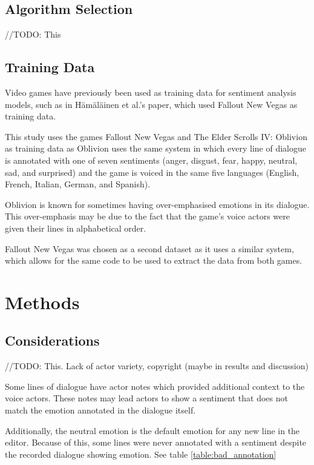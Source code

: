 \documentclass[journal]{IEEEtran}
\begin{document}
\subsection{Algorithm Selection}
//TODO: This

\subsection{Training Data}
Video games have previously been used as training data for sentiment analysis models, such as in
Hämäläinen et al.'s paper, \cite{hamalainen_video_2022} which used Fallout New Vegas as training data.

This study uses the games Fallout New Vegas and The Elder Scrolls IV: Oblivion as training data as
Oblivion uses the same system in which every line of dialogue is annotated with one of seven sentiments
(anger, disgust, fear, happy, neutral, sad, and surprised) and the game is voiced in the same five languages
(English, French, Italian, German, and Spanish).

Oblivion is known for sometimes having over-emphasised emotions in its dialogue.
This over-emphasis may be due to the fact that the game's voice actors were given their lines
in alphabetical order. \cite{noclip_-_video_game_documentaries_music_2018}

Fallout New Vegas was chosen as a second dataset as it uses a similar system, which
allows for the same code to be used to extract the data from both games.

\section{Methods}
\subsection{Considerations}
//TODO: This. Lack of actor variety, copyright (maybe in results and discussion)

Some lines of dialogue have actor notes which provided additional context to
the voice actors. These notes may lead actors to show a sentiment that does not
match the emotion annotated in the dialogue itself.

Additionally, the neutral emotion is the default emotion for any new line in the editor.
Because of this, some lines were never annotated with a sentiment despite the recorded
dialogue showing emotion. See table \ref{table:bad_annotation}
\end{document}
